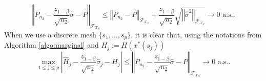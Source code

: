 \documentclass[mnsc,blindrev]{informs4} %
\newcommand{\norm}[1]{\left \Vert #1 \right\Vert}
\newcommand{\abs}[1]{\left \vert #1 \right\vert}
\begin{document}
\begin{equation*}%
\norm{P_{n_2}-\frac{z_{1-\beta}}{\sqrt{n_2}}\hat{\sigma}-P}_{\mathcal F_{\mathcal X_S}}\leq \norm{P_{n_2}-P}_{\mathcal F_{\mathcal X_S}}+\frac{z_{1-\beta}}{\sqrt{n_2}}\sqrt{\norm{\hat{\sigma}^2}_{\mathcal F_{\mathcal X_S}}}\to 0\text{\ a.s.}.
\end{equation*}
When we use a discrete mesh $\{s_1,\ldots,s_p\}$, it is clear that, using the notations from Algorithm \ref{algo:marginal} and $H_j:=H(x^*(s_j))$
\begin{equation}\label{uniform convergence with margin}
\max_{1\leq j\leq p} \abs{\hat H_j-\frac{z_{1-\beta}}{\sqrt{n_2}}\hat{\sigma}_j-H_j}\leq \norm{P_{n_2}-\frac{z_{1-\beta}}{\sqrt{n_2}}\hat{\sigma}-P}_{\mathcal F_{\mathcal X_S}}\to 0\text{\ a.s.}.
\end{equation}
\end{document}
